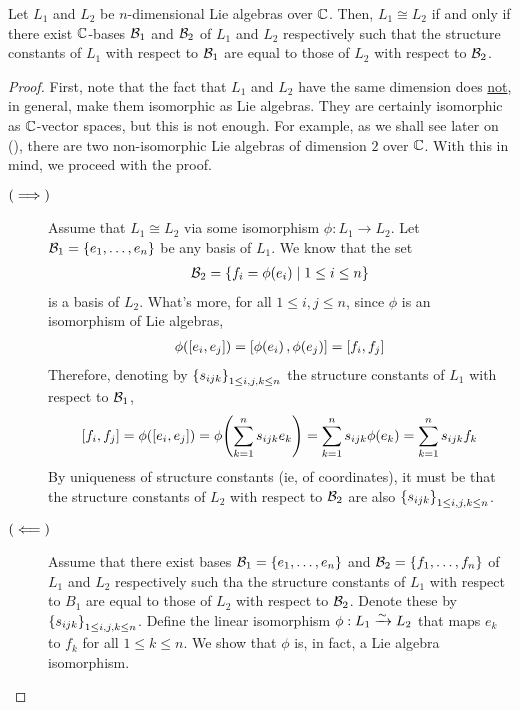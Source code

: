 \begin{boxtheorem}\label{Ch1:Thm:StructureConstantsMeaning}
    Let $L_1$ and $L_2$ be $n$-dimensional Lie algebras over $\mathbb{C}$. Then,
    $L_1 \cong L_2$ if and only if there exist $\mathbb{C}$-bases $\mathcal{B}_1$ and $\mathcal{B}_2$ of $L_1$ and $L_2$ respectively such that the structure constants of $L_1$ with respect to $\mathcal{B}_1$ are equal to those of $L_2$ with respect to $\mathcal{B}_2$.
\end{boxtheorem}
\begin{proof}
    First, note that the fact that $L_1$ and $L_2$ have the same dimension does \underline{not}, in general, make them isomorphic as Lie algebras. They are certainly isomorphic as $\mathbb{C}$-vector spaces, but this is not enough. For example, as we shall see later on (), there are two non-isomorphic Lie algebras of dimension $2$ over $\mathbb{C}$. With this in mind, we proceed with the proof.
    \begin{description}
        \item[$\left( \implies \right)$] Assume that $L_1 \cong L_2$ via some isomorphism $\phi : L_1 \to L_2$. Let $\mathcal{B}_1 = \left\{ e_1, \ldots, e_n \right\}$ be any basis of $L_1$. We know that the set
        \begin{align*}
            \mathcal{B}_2 = \left\{ f_i = \phi\!\left( e_i \right) \; \middle\vert \; 1 \leq i \leq n \right\}
        \end{align*}
        is a basis of $L_2$. What's more, for all $1 \leq i, j \leq n$, since $\phi$ is an isomorphism of Lie algebras,
        \begin{align*}
            \phi\!\left( \left[ e_i, e_j \right] \right) = \left[ \phi\!\left( e_i \right), \phi\!\left( e_j \right) \right] = \left[ f_i, f_j \right]
        \end{align*}
        Therefore, denoting by $\left\{ s_{ijk} \right\}_{1 \leq i, j, k \leq n}$ the structure constants of $L_1$ with respect to $\mathcal{B}_1$,
        \begin{align*}
            \left[ f_i, f_j \right] = \phi\!\left( \left[ e_i, e_j \right] \right) = \phi\!\left( \sum_{k=1}^{n} s_{ijk} e_k \right) = \sum_{k=1}^{n} s_{ijk} \phi\!\left( e_k \right) = \sum_{k=1}^{n} s_{ijk} f_k
        \end{align*}
        By uniqueness of structure constants (ie, of coordinates), it must be that the structure constants of $L_2$ with respect to $\mathcal{B}_2$ are also $\left\{ s_{ijk} \right\}_{1 \leq i, j, k \leq n}$.

        \item[$\left( \impliedby \right)$] Assume that there exist bases $\mathcal{B}_1 = \left\{ e_1, \ldots, e_n \right\}$ and $\mathcal{B}_2 = \left\{ f_1, \ldots, f_n \right\}$ of $L_1$ and $L_2$ respectively such tha the structure constants of $L_1$ with respect to $B_1$ are equal to those of $L_2$ with respect to $\mathcal{B}_2$. Denote these by $\left\{ s_{ijk} \right\}_{1 \leq i, j, k \leq n}$. Define the linear isomorphism $\phi : L_1 \xrightarrow{\sim} L_2$ that maps $e_k$ to $f_k$ for all $1 \leq k \leq n$. We show that $\phi$ is, in fact, a Lie algebra isomorphism. 
        

\end{description}
\end{proof}
